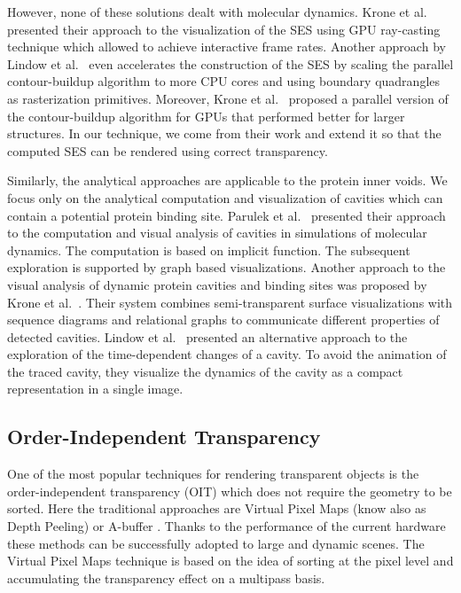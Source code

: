 However, none of these solutions dealt with molecular dynamics. 
Krone et al.~\cite{krone2009interactive} presented their approach to the visualization of the SES using GPU ray-casting technique which allowed to achieve interactive frame rates. 
Another approach by Lindow et al.~\cite{lindow2010accelerated} even accelerates the construction of the SES by scaling the parallel contour-buildup algorithm to more CPU cores and using boundary quadrangles as rasterization primitives.
Moreover, Krone et al.~\cite{krone2011parallel} proposed a parallel version of the contour-buildup algorithm for GPUs that performed better for larger structures.
In our technique, we come from their work and extend it so that the computed SES can be rendered using correct transparency.

Similarly, the analytical approaches are applicable to the protein inner voids. 
We focus only on the analytical computation and visualization of cavities which can contain a potential protein binding site.
Parulek et al.~\cite{parulek2013visual} presented their approach to the computation and visual analysis of cavities in simulations of molecular dynamics.
The computation is based on implicit function. 
The subsequent exploration is supported by graph based visualizations.
Another approach to the visual analysis of dynamic protein cavities and binding sites was proposed by Krone et al.~\cite{Krone2014}.
Their system combines semi-transparent surface visualizations with sequence diagrams and relational graphs to communicate different properties of detected cavities.
Lindow et al.~\cite{Lindow2013} presented an alternative approach to the exploration of the time-dependent changes of a cavity. 
To avoid the animation of the traced cavity, they visualize the dynamics of the cavity as a compact representation in a single image. 

\subsection{Order-Independent Transparency}
One of the most popular techniques for rendering transparent objects is the order-independent transparency (OIT) which does not require the geometry to be sorted.
Here the traditional approaches are Virtual Pixel Maps (know also as Depth Peeling) \cite{mammen1989transparency} or A-buffer \cite{carpenter1984abuffer}.
Thanks to the performance of the current hardware these methods can be successfully adopted to large and dynamic scenes.
The Virtual Pixel Maps technique is based on the idea of sorting at the pixel level and accumulating the transparency effect on a multipass basis. 

